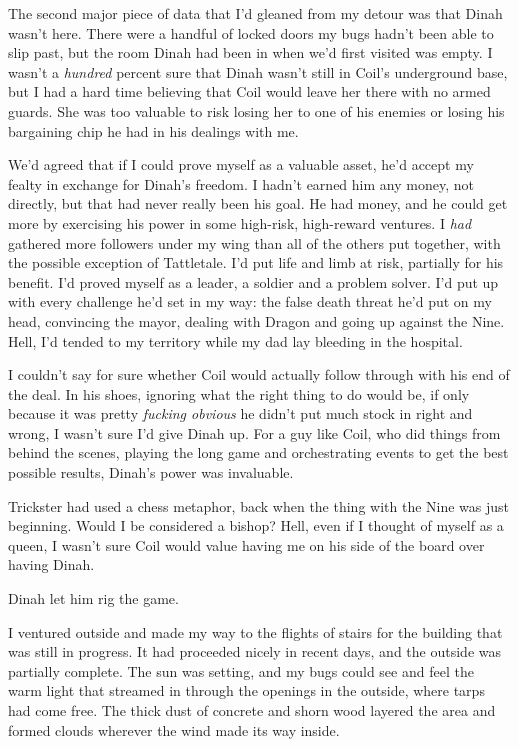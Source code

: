 The second major piece of data that I'd gleaned from my detour was that Dinah wasn't here.  There were a handful of locked doors my bugs hadn't been able to slip past, but the room Dinah had been in when we'd first visited was empty.  I wasn't a \emph{hundred} percent sure that Dinah wasn't still in Coil's underground base, but I had a hard time believing that Coil would leave her there with no armed guards.  She was too valuable to risk losing her to one of his enemies or losing his bargaining chip he had in his dealings with me.



We'd agreed that if I could prove myself as a valuable asset, he'd accept my fealty in exchange for Dinah's freedom.  I hadn't earned him any money, not directly, but that had never really been his goal.  He had money, and he could get more by exercising his power in some high-risk, high-reward ventures.  I \emph{had} gathered more followers under my wing than all of the others put together, with the possible exception of Tattletale.  I'd put life and limb at risk, partially for his benefit.  I'd proved myself as a leader, a soldier and a problem solver.  I'd put up with every challenge he'd set in my way: the false death threat he'd put on my head, convincing the mayor, dealing with Dragon and going up against the Nine.  Hell, I'd tended to my territory while my dad lay bleeding in the hospital.



I couldn't say for sure whether Coil would actually follow through with his end of the deal.  In his shoes, ignoring what the right thing to do would be, if only because it was pretty \emph{fucking obvious} he didn't put much stock in right and wrong, I wasn't sure I'd give Dinah up.  For a guy like Coil, who did things from behind the scenes, playing the long game and orchestrating events to get the best possible results, Dinah's power was invaluable.



Trickster had used a chess metaphor, back when the thing with the Nine was just beginning.  Would I be considered a bishop?  Hell, even if I thought of myself as a queen, I wasn't sure Coil would value having me on his side of the board over having Dinah.



Dinah let him rig the game.



I ventured outside and made my way to the flights of stairs for the building that was still in progress.  It had proceeded nicely in recent days, and the outside was partially complete.  The sun was setting, and my bugs could see and feel the warm light that streamed in through the openings in the outside, where tarps had come free.  The thick dust of concrete and shorn wood layered the area and formed clouds wherever the wind made its way inside.



